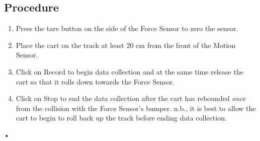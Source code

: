 \documentclass[main.tex]{subfiles}
\begin{document}
\subsection*{Procedure}
\begin{enumerate}
\item
Press the tare button on the side of the Force Sensor to zero the sensor.
\item
Place the cart on the track at least 20 cm from the front of the Motion Sensor.
\item
Click on Record to begin data collection and at the same time release the cart so that it rolls down towards the Force Sensor.
\item
Click on Stop to end the data collection after the cart has rebounded \emph{once} from the collision with the Force Sensor's bumper. n.b., it is best to allow the cart to begin to roll back up the track before ending data collection.
\end{enumerate}•
\end{document}
